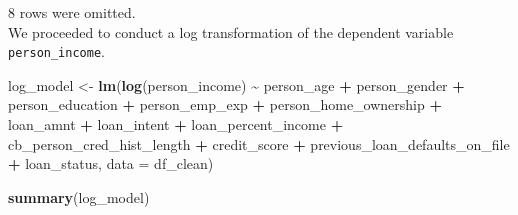 \documentclass[
  10pt,
]{article}
\newenvironment{Shaded}{\begin{snugshade}}{\end{snugshade}}
\newcommand{\AttributeTok}[1]{\textcolor[rgb]{0.13,0.29,0.53}{#1}}
\newcommand{\FunctionTok}[1]{\textcolor[rgb]{0.13,0.29,0.53}{\textbf{#1}}}
\newcommand{\NormalTok}[1]{#1}
\newcommand{\OtherTok}[1]{\textcolor[rgb]{0.56,0.35,0.01}{#1}}
\newcommand{\SpecialCharTok}[1]{\textcolor[rgb]{0.81,0.36,0.00}{\textbf{#1}}}
\begin{document}
8 rows were omitted.\\
We proceeded to conduct a log transformation of the dependent variable
\texttt{person\_income}.\\

\begin{Shaded}
\begin{Highlighting}[]
\NormalTok{log\_model }\OtherTok{\textless{}{-}} \FunctionTok{lm}\NormalTok{(}\FunctionTok{log}\NormalTok{(person\_income) }\SpecialCharTok{\textasciitilde{}}\NormalTok{ person\_age }\SpecialCharTok{+}\NormalTok{ person\_gender }\SpecialCharTok{+}
\NormalTok{    person\_education }\SpecialCharTok{+}\NormalTok{ person\_emp\_exp }\SpecialCharTok{+}\NormalTok{ person\_home\_ownership }\SpecialCharTok{+}
\NormalTok{    loan\_amnt }\SpecialCharTok{+}\NormalTok{ loan\_intent }\SpecialCharTok{+}\NormalTok{ loan\_percent\_income }\SpecialCharTok{+}\NormalTok{ cb\_person\_cred\_hist\_length }\SpecialCharTok{+}
\NormalTok{    credit\_score }\SpecialCharTok{+}\NormalTok{ previous\_loan\_defaults\_on\_file }\SpecialCharTok{+}\NormalTok{ loan\_status,}
    \AttributeTok{data =}\NormalTok{ df\_clean)}

\FunctionTok{summary}\NormalTok{(log\_model)}
\end{Highlighting}
\end{Shaded}
\end{document}
